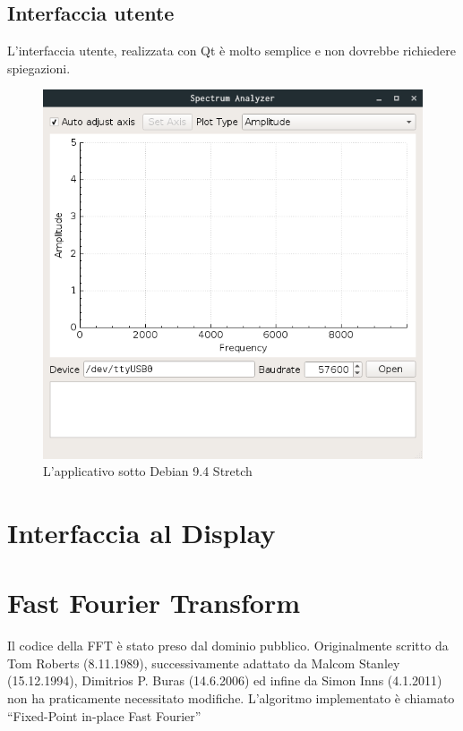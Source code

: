 \subsection{Interfaccia utente}
L'interfaccia utente, realizzata con Qt \`e molto semplice e non dovrebbe
richiedere spiegazioni. 
\begin{figure}[H] \centering
	\includegraphics[width=.5\textwidth]{figures/screenshots/desktop-debian-empty}
    \caption{L'applicativo sotto Debian 9.4 Stretch}
\end{figure}

\section{Interfaccia al Display}

\section{Fast Fourier Transform}
Il codice della FFT \`e stato preso dal dominio pubblico. Originalmente
scritto da Tom Roberts (8.11.1989), successivamente adattato da Malcom Stanley
(15.12.1994), Dimitrios P. Buras (14.6.2006) ed infine da Simon Inns
(4.1.2011) \cite{waitingforfriday} non ha praticamente necessitato modifiche.
L'algoritmo implementato \`e chiamato ``Fixed-Point in-place Fast Fourier''


